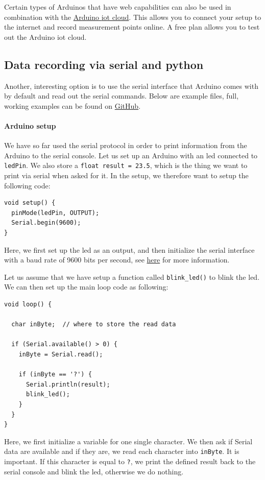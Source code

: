 Certain types of Arduinos that have web capabilities can also be used in combination with the \href{https://docs.arduino.cc/cloud/iot-cloud}{Arduino \ac{iot} cloud}. This allows you to connect your setup to the internet and record measurement points online. A free plan allows you to test out the Arduino \ac{iot} cloud. 

\subsection{Data recording via serial and python}

Another, interesting option is to use the serial interface that Arduino comes with by default and read out the serial commands. Below are example files, full, working examples can be found on \href{https://github.com/galactic-forensics/workshop_arduino_electronics/tree/main/further_examples/data_logger}{GitHub}. 

\paragraph{Arduino setup} We have so far used the serial protocol in order to print information from the Arduino to the serial console. Let us set up an Arduino with an \ac{led} connected to \lstinline{ledPin}. We also store a \lstinline{float result = 23.5}, which is the thing we want to print via serial when asked for it. In the setup, we therefore want to setup the following code:
\begin{lstlisting}
void setup() {
  pinMode(ledPin, OUTPUT);
  Serial.begin(9600);
}
\end{lstlisting}
Here, we first set up the \ac{led} as an output, and then initialize the serial interface with a baud rate of 9600 bits per second, see \href{https://www.arduino.cc/en/Serial.Begin}{here} for more information.

Let us assume that we have setup a function called \lstinline{blink_led()} to blink the \ac{led}. We can then set up the main loop code as following:
\begin{lstlisting}
void loop() {

  char inByte;  // where to store the read data
  
  if (Serial.available() > 0) {
    inByte = Serial.read();

    if (inByte == '?') {
      Serial.println(result);
      blink_led();
    } 
  }
}
\end{lstlisting}
Here, we first initialize a variable for one single character. We then ask if Serial data are available and if they are, we read each character into \lstinline{inByte}. It is important. If this character is equal to \lstinline{?}, we print the defined result back to the serial console and blink the \ac{led}, otherwise we do nothing. 

